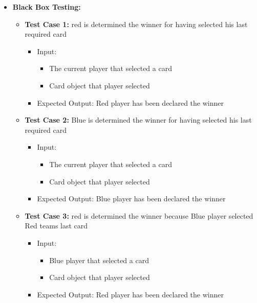 \documentclass[12pt]{article}
\begin{document}
\begin{itemize}
    \item \textbf{Black Box Testing:} 
    \begin{itemize}
       \item \textbf{Test Case 1:} red is determined the winner for having selected his last required card
            \begin{itemize}
            \item Input: 
                \begin{itemize}
                    \item The current player that selected a card
                    \item Card object that player selected
                \end{itemize}
            \item Expected Output: Red player has been declared the winner
            \end{itemize}
        \item \textbf{Test Case 2:} Blue is determined the winner for having selected his last required card
            \begin{itemize}
            \item Input: 
                \begin{itemize}
                    \item The current player that selected a card
                    \item Card object that player selected
                \end{itemize}
            \item Expected Output: Blue player has been declared the winner
            \end{itemize}
        \item \textbf{Test Case 3:} red is determined the winner because Blue player selected Red teams last card
            \begin{itemize}
            \item Input: 
                \begin{itemize}
                    \item Blue player that selected a card
                    \item Card object that player selected
                \end{itemize}
            \item Expected Output: Red player has been declared the winner
            \end{itemize}

\end{itemize}
\end{itemize}
\end{document}
